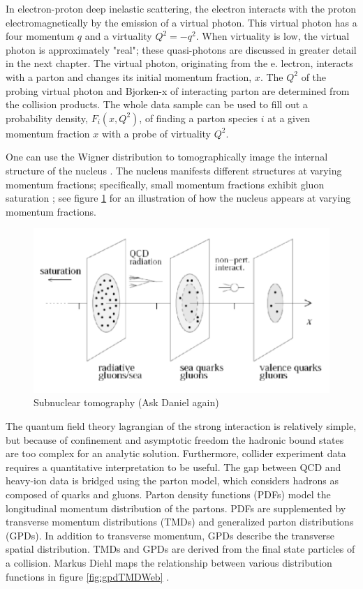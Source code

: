 In electron-proton deep inelastic scattering, the electron interacts with the proton electromagnetically by the emission of a virtual photon. This virtual photon has a four momentum $q$ and a virtuality $Q^2 = - q^2$. When virtuality is low, the virtual photon is approximately "real"; these quasi-photons are discussed in greater detail in the next chapter. The virtual photon, originating from the e. lectron, interacts with a parton and changes its initial momentum fraction, $x$. The $Q^2$ of the probing virtual photon and Bjorken-x of interacting parton are determined from the collision products. The whole data sample can be used to fill out a probability density, $F_i(x, Q^2)$, of finding a parton species $i$ at a given momentum fraction $x$ with a probe of virtuality $Q^2$.

One can use the Wigner distribution to tomographically image the internal structure of the nucleus \cite{Hatta:2016dxp}. The nucleus manifests different structures at varying momentum fractions; specifically, small momentum fractions exhibit gluon saturation \cite{Boer:2011fh}; see figure \ref{fig:nuclImag} for an illustration of how the nucleus appears at varying momentum fractions.

\begin{figure}[h!]
\begin{centering}
\includegraphics[width=7in]{Chapter1/importfigs/imaging_the_nucleon_upc_dijets_pres.png}
\par\end{centering}
\caption{Subnuclear tomography (Ask Daniel again) \label{fig:nuclImag}}
\end{figure}

The quantum field theory lagrangian of the strong interaction is relatively simple, but because of confinement and asymptotic freedom the hadronic bound states are too complex for an analytic solution. Furthermore, collider experiment data requires a quantitative interpretation to be useful. The gap between QCD and heavy-ion data is bridged using the parton model, which considers hadrons as composed of quarks and gluons. Parton density functions (PDFs) model the longitudinal momentum distribution of the partons. PDFs are supplemented by transverse momentum distributions (TMDs) and generalized parton distributions (GPDs). In addition to transverse momentum, GPDs describe the transverse spatial distribution. TMDs and GPDs are derived from the final state particles of a collision. Markus Diehl maps the relationship between various distribution functions in figure \ref{fig:gpdTMDWeb} \cite{Diehl:2003ny}.

